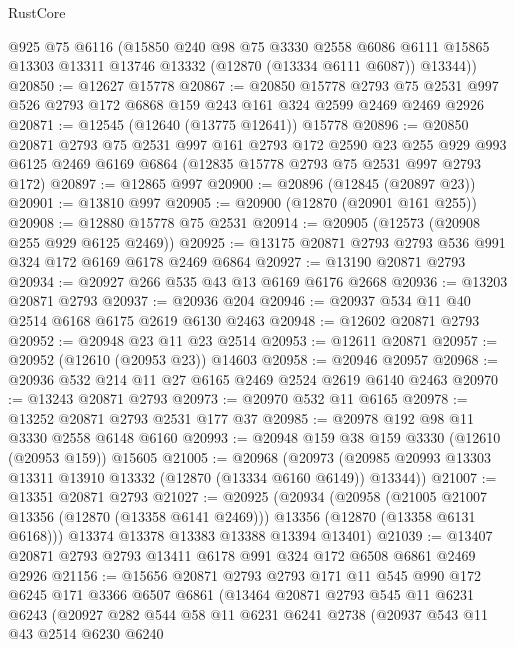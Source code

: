 \begin{lexlean}{RustCore}
\begin{coremodule}
      @925
      @75
      @6116
      (@15850
        @240
        @98
        @75
        @3330
        @2558
        @6086
        @6111
        @15865
        @13303
        @13311
        @13746
        @13332
        (@12870 (@13334 @6111 @6087))
        @13344))
@20850 := @12627 @15778
@20867 := @20850
    @15778
    @2793
    @75
    @2531
    @997
    @526
    @2793
    @172
    @6868
    @159
    @243
    @161
    @324
    @2599
    @2469
    @2469
    @2926
@20871 := @12545 (@12640 (@13775 @12641)) @15778
@20896 := @20850
    @20871
    @2793
    @75
    @2531
    @997
    @161
    @2793
    @172
    @2590
    @23
    @255
    @929
    @993
    @6125
    @2469
    @6169
    @6864
    (@12835 @15778 @2793 @75 @2531 @997 @2793 @172)
@20897 := @12865 @997
@20900 := @20896 (@12845 (@20897 @23))
@20901 := @13810 @997
@20905 := @20900 (@12870 (@20901 @161 @255))
@20908 := @12880 @15778 @75 @2531
@20914 := @20905 (@12573 (@20908 @255 @929 @6125 @2469))
@20925 := @13175 @20871 @2793 @2793 @536 @991 @324 @172 @6169 @6178 @2469 @6864
@20927 := @13190 @20871 @2793
@20934 := @20927 @266 @535 @43 @13 @6169 @6176 @2668
@20936 := @13203 @20871 @2793
@20937 := @20936 @204
@20946 := @20937 @534 @11 @40 @2514 @6168 @6175 @2619 @6130 @2463
@20948 := @12602 @20871 @2793
@20952 := @20948 @23 @11 @23 @2514
@20953 := @12611 @20871
@20957 := @20952 (@12610 (@20953 @23)) @14603
@20958 := @20946 @20957
@20968 := @20936 @532 @214 @11 @27 @6165 @2469 @2524 @2619 @6140 @2463
@20970 := @13243 @20871 @2793
@20973 := @20970 @532 @11 @6165
@20978 := @13252 @20871 @2793 @2531 @177 @37
@20985 := @20978 @192 @98 @11 @3330 @2558 @6148 @6160
@20993 := @20948 @159 @38 @159 @3330 (@12610 (@20953 @159)) @15605
@21005 := @20968
    (@20973 (@20985 @20993 @13303 @13311 @13910 @13332 (@12870 (@13334 @6160 @6149)) @13344))
@21007 := @13351 @20871 @2793
@21027 := @20925
    (@20934
      (@20958
        (@21005 @21007 @13356 (@12870 (@13358 @6141 @2469)))
        @13356
        (@12870 (@13358 @6131 @6168)))
      @13374
      @13378
      @13383
      @13388
      @13394
      @13401)
@21039 := @13407 @20871 @2793 @2793 @13411 @6178 @991 @324 @172 @6508 @6861 @2469 @2926
@21156 := @15656
    @20871
    @2793
    @2793
    @171
    @11
    @545
    @990
    @172
    @6245
    @171
    @3366
    @6507
    @6861
    (@13464
      @20871
      @2793
      @545
      @11
      @6231
      @6243
      (@20927
        @282
        @544
        @58
        @11
        @6231
        @6241
        @2738
        (@20937
          @543
          @11
          @43
          @2514
          @6230
          @6240

\end{coremodule}
\end{lexlean}
